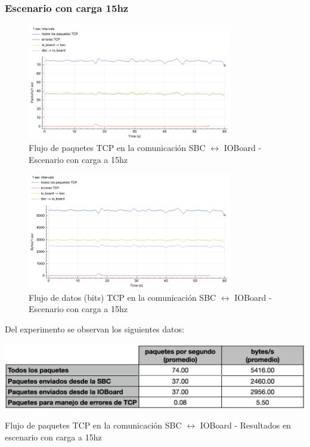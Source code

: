 \documentclass[withindex,glossary]{cam-thesis}
\begin{document}
\subsubsection{Escenario con carga 15hz}
\begin{figure}[H]
  \centering
  	\includegraphics[width=0.8\textwidth]{images/TCP_Throughput_io_to_pc_15hz_pps}
  	\caption[Throughput de la conexión TCP - Escenario con carga a 15hz]{Flujo de paquetes TCP en la comunicación SBC $\leftrightarrow$ IOBoard -  Escenario con carga a 15hz}
  \label{fig:TCP_Throughput_io_to_pc_15hz_pps}
\end{figure}

\begin{figure}[H]
  \centering
  	\includegraphics[width=0.8\textwidth]{images/TCP_Throughput_io_to_pc_15hz_bps}
  	\caption[Throughput de la conexión TCP - Escenario con carga a 15hz]{Flujo de datos (bits) TCP en la comunicación SBC $\leftrightarrow$ IOBoard -  Escenario con carga a 15hz}
  \label{fig:TCP_Throughput_io_to_pc_15hz_bps}
\end{figure}
Del experimento se observan los siguientes datos:
\begin{table}[H]
	\centering
 	\begin{minipage}[b]{0.6\textwidth}  	
  		\includegraphics[width=\textwidth]{images/TCP_Throughput_io_to_pc_15hz_results}
  		\caption[Throughput de la conexión TCP - Escenario con carga a 15hz]{Flujo de paquetes TCP en la comunicación SBC $\leftrightarrow$ IOBoard -  Resultados en escenario con carga a 15hz}
		\label{fig:TCP_Throughput_io_to_pc_15hz_results}
	\end{minipage}
\end{table}
\end{document}
